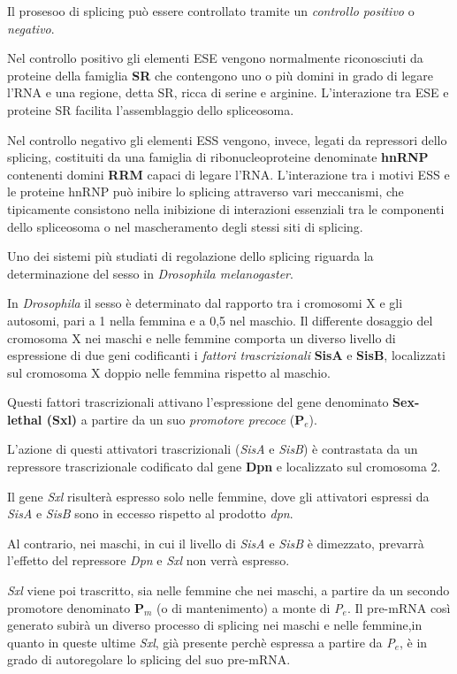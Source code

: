 \documentclass[11pt]{book}
\begin{document}
Il prosesoo di splicing può essere controllato tramite un
\emph{controllo positivo} o \emph{negativo}.

Nel controllo positivo gli elementi ESE vengono normalmente riconosciuti
da proteine della famiglia \textbf{SR} che contengono uno o più domini
in grado di legare l'RNA e una regione, detta SR, ricca di serine e
arginine. L'interazione tra ESE e proteine SR facilita l'assemblaggio
dello spliceosoma.

Nel controllo negativo gli elementi ESS vengono, invece, legati da
repressori dello splicing, costituiti da una famiglia di
ribonucleoproteine denominate \textbf{hnRNP} contenenti domini
\textbf{RRM} capaci di legare l'RNA. L'interazione tra i motivi ESS e le
proteine hnRNP può inibire lo splicing attraverso vari meccanismi, che
tipicamente consistono nella inibizione di interazioni essenziali tra le
componenti dello spliceosoma o nel mascheramento degli stessi siti di
splicing.

Uno dei sistemi più studiati di regolazione dello splicing riguarda la
determinazione del sesso in \emph{Drosophila melanogaster}.

In \emph{Drosophila} il sesso è determinato dal rapporto tra i cromosomi
X e gli autosomi, pari a 1 nella femmina e a 0,5 nel maschio. Il
differente dosaggio del cromosoma X nei maschi e nelle femmine comporta
un diverso livello di espressione di due geni codificanti i
\emph{fattori trascrizionali} \textbf{SisA} e \textbf{SisB}, localizzati
sul cromosoma X doppio nelle femmina rispetto al maschio.

Questi fattori trascrizionali attivano l'espressione del gene denominato
\textbf{Sex-lethal (Sxl)} a partire da un suo \emph{promotore precoce}
(\textbf{P\(_e\)}).

L'azione di questi attivatori trascrizionali (\emph{SisA} e \emph{SisB})
è contrastata da un repressore trascrizionale codificato dal gene
\textbf{Dpn} e localizzato sul cromosoma 2.

Il gene \emph{Sxl} risulterà espresso solo nelle femmine, dove gli
attivatori espressi da \emph{SisA} e \emph{SisB} sono in eccesso
rispetto al prodotto \emph{dpn}.

Al contrario, nei maschi, in cui il livello di \emph{SisA} e \emph{SisB}
è dimezzato, prevarrà l'effetto del repressore \emph{Dpn} e \emph{Sxl}
non verrà espresso.

\emph{Sxl} viene poi trascritto, sia nelle femmine che nei maschi, a
partire da un secondo promotore denominato \textbf{P\(_m\)} (o di
mantenimento) a monte di \emph{P\(_e\)}. Il pre-mRNA così generato
subirà un diverso processo di splicing nei maschi e nelle femmine,in
quanto in queste ultime \emph{Sxl}, già presente perchè espressa a
partire da \emph{P\(_e\)}, è in grado di autoregolare lo splicing del
suo pre-mRNA.
\end{document}
